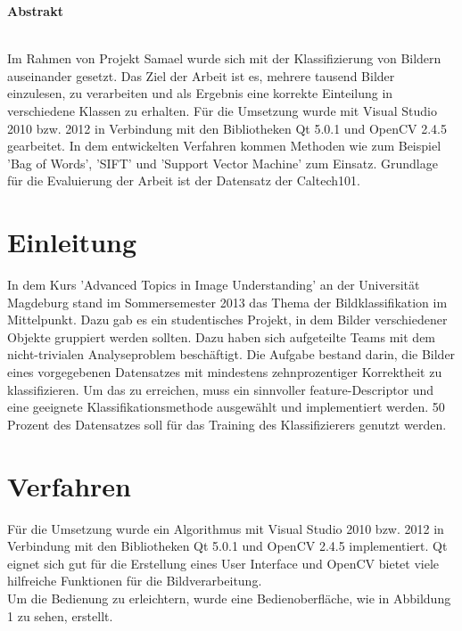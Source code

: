 \documentclass[liststotoc,11pt,a4paper]{article}
\begin{document}
\thispagestyle{empty}
\newpage
\tableofcontents                %
\newpage
\setcounter{page}{1}

\Large \bfseries Abstrakt\\
\normalsize \mdseries
{}
\normalfont
\\Im Rahmen von Projekt Samael wurde sich mit der Klassifizierung von Bildern auseinander gesetzt. Das Ziel der Arbeit ist es, mehrere tausend Bilder einzulesen, zu verarbeiten und als Ergebnis eine korrekte Einteilung in verschiedene Klassen zu erhalten. Für die Umsetzung wurde mit Visual Studio 2010 bzw. 2012 in Verbindung mit den Bibliotheken Qt 5.0.1 und OpenCV 2.4.5 gearbeitet. In dem entwickelten Verfahren kommen Methoden wie zum Beispiel 'Bag of Words', 'SIFT' und 'Support Vector Machine' zum Einsatz. %
Grundlage für die Evaluierung der Arbeit ist der Datensatz der Caltech101. 

\section{Einleitung}
In dem Kurs 'Advanced Topics in Image Understanding' an der Universität Magdeburg stand im Sommersemester 2013 das Thema der Bildklassifikation im Mittelpunkt. Dazu gab es ein studentisches Projekt, in dem Bilder verschiedener Objekte gruppiert werden sollten. Dazu haben sich aufgeteilte Teams mit dem nicht-trivialen Analyseproblem beschäftigt. Die Aufgabe bestand darin, die Bilder eines vorgegebenen Datensatzes mit mindestens zehnprozentiger Korrektheit zu klassifizieren. 
Um das zu erreichen, muss ein sinnvoller feature-Descriptor und eine geeignete Klassifikationsmethode ausgewählt und implementiert werden. 50 Prozent des Datensatzes soll für das Training des Klassifizierers genutzt werden.

\section{Verfahren}
Für die Umsetzung wurde ein Algorithmus mit Visual Studio 2010 bzw. 2012 in Verbindung mit den Bibliotheken Qt 5.0.1 und OpenCV 2.4.5 implementiert. Qt eignet sich gut für die Erstellung eines User Interface und OpenCV bietet viele hilfreiche Funktionen für die Bildverarbeitung.\\Um die Bedienung zu erleichtern, wurde eine Bedienoberfläche, wie in Abbildung 1 zu sehen, erstellt.
\end{document}
